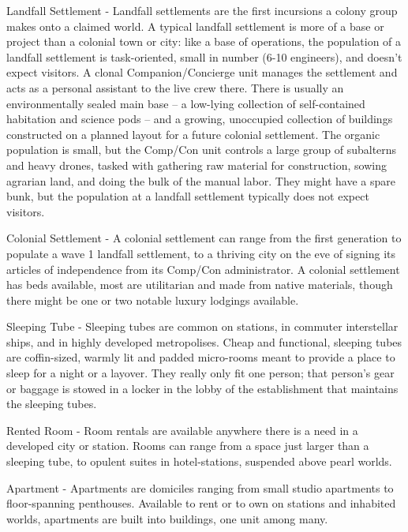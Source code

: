 Landfall Settlement - Landfall settlements are the first incursions a colony group makes onto a  
claimed world. A typical landfall settlement is more of a base or project than a colonial town or  
city: like a base of operations, the population of a landfall settlement is task-oriented, small in  
number (6-10 engineers), and doesn’t expect visitors. A clonal Companion/Concierge unit  
manages the settlement and acts as a personal assistant to the live crew there. There is usually  
an environmentally sealed main base -- a low-lying collection of self-contained habitation and  
science pods -- and a growing, unoccupied collection of buildings constructed on a planned  
layout for a future colonial settlement. The organic population is small, but the Comp/Con unit  
controls a large group of subalterns and heavy drones, tasked with gathering raw material for  
construction, sowing agrarian land, and doing the bulk of the manual labor. They might have a  
spare bunk, but the population at a landfall settlement typically does not expect visitors.       
 

Colonial Settlement - A colonial settlement can range from the first generation to populate a  
wave 1 landfall settlement, to a thriving city on the eve of signing its articles of independence  
from its Comp/Con administrator. A colonial settlement has beds available, most are utilitarian  
and made from native materials, though there might be one or two notable luxury lodgings  
available. 
 
 
 
Sleeping Tube - Sleeping tubes are common on stations, in commuter interstellar ships, and in  
highly developed metropolises. Cheap and functional, sleeping tubes are coffin-sized, warmly lit  
and padded micro-rooms meant to provide a place to sleep for a night or a layover. They really  
only fit one person; that person’s gear or baggage is stowed in a locker in the lobby of the  
establishment that maintains the sleeping tubes. 
 

Rented Room - Room rentals are available anywhere there is a need in a developed city or  
station. Rooms can range from a space just larger than a sleeping tube, to opulent suites in  
hotel-stations, suspended above pearl worlds. 
 
 
 
Apartment  - Apartments are domiciles ranging from small studio apartments to floor-spanning  
penthouses. Available to rent or to own on stations and inhabited worlds, apartments are built  
into buildings, one unit among many.   
 

